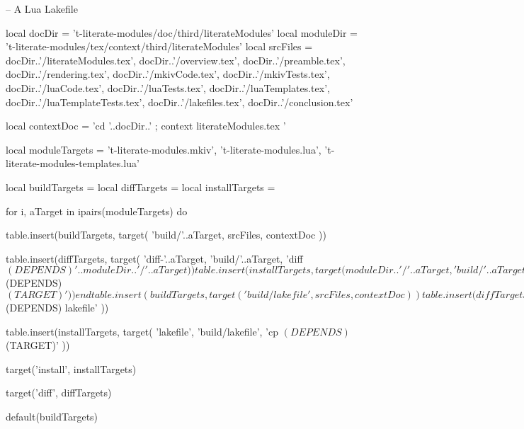 \startLakefile
-- A Lua Lakefile

local docDir = 't-literate-modules/doc/third/literateModules'
local moduleDir = 't-literate-modules/tex/context/third/literateModules'
local srcFiles = {
  docDir..'/literateModules.tex',
  docDir..'/overview.tex',
  docDir..'/preamble.tex',
  docDir..'/rendering.tex',
  docDir..'/mkivCode.tex',
  docDir..'/mkivTests.tex',
  docDir..'/luaCode.tex',
  docDir..'/luaTests.tex',
  docDir..'/luaTemplates.tex',
  docDir..'/luaTemplateTests.tex',
  docDir..'/lakefiles.tex',
  docDir..'/conclusion.tex'
}

local contextDoc = 
  'cd '..docDir..' ; context literateModules.tex '

local moduleTargets = {
  't-literate-modules.mkiv',
  't-literate-modules.lua',
  't-literate-modules-templates.lua'
}

local buildTargets   = { }
local diffTargets    = { }
local installTargets = { }

for i, aTarget in ipairs(moduleTargets) do

  table.insert(buildTargets, target(
    'build/'..aTarget,
    srcFiles,
    contextDoc
  ))

  table.insert(diffTargets, target(
    'diff-'..aTarget,
    'build/'..aTarget,
    'diff $(DEPENDS) '..moduleDir..'/'..aTarget
  ))

  table.insert(installTargets, target(
    moduleDir..'/'..aTarget,
    'build/'..aTarget,
    'cp $(DEPENDS) $(TARGET)'
  ))
end

table.insert(buildTargets, target(
  'build/lakefile',
  srcFiles,
  contextDoc
))

table.insert(diffTargets, target(
  'diff-lakefile',
  'build/lakefile',
  'diff $(DEPENDS) lakefile'
))

table.insert(installTargets, target(
  'lakefile',
  'build/lakefile',
  'cp $(DEPENDS) $(TARGET)'
))

target('install', installTargets)

target('diff', diffTargets)

default(buildTargets)

\stopLakefile

\stopchapter